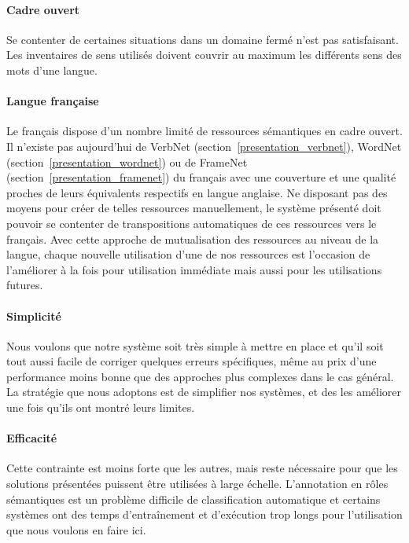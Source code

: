 \paragraph{Cadre ouvert} Se contenter de certaines situations dans un domaine
fermé n'est pas satisfaisant. Les inventaires de sens utilisés doivent couvrir
au maximum les différents sens des mots d'une langue.

\paragraph{Langue française} Le français dispose d'un nombre limité de
ressources sémantiques en cadre ouvert. Il n'existe pas aujourd'hui de VerbNet
(section~\ref{presentation_verbnet}), WordNet
(section~\ref{presentation_wordnet}) ou de FrameNet
(section~\ref{presentation_framenet}) du français avec une couverture et une
qualité proches de leurs équivalents respectifs en langue anglaise. Ne
disposant pas des moyens pour créer de telles ressources manuellement, le
système présenté doit pouvoir se contenter de transpositions automatiques de
ces ressources vers le français. Avec cette approche de mutualisation des
ressources au niveau de la langue, chaque nouvelle utilisation d'une de nos
ressources est l'occasion de l'améliorer à la fois pour utilisation immédiate
mais aussi pour les utilisations futures.

\paragraph{Simplicité} Nous voulons que notre système soit très simple à mettre
en place et qu'il soit tout aussi facile de corriger quelques erreurs
spécifiques, même au prix d'une performance moins bonne que des approches plus
complexes dans le cas général. La stratégie que nous adoptons est de simplifier
nos systèmes, et des les améliorer une fois qu'ils ont montré leurs limites.

\paragraph{Efficacité} Cette contrainte est moins forte que les autres, mais
reste nécessaire pour que les solutions présentées puissent être utilisées à
large échelle. L'annotation en rôles sémantiques est un problème difficile de
classification automatique et certains systèmes ont des temps d'entraînement et
d'exécution trop longs pour l'utilisation que nous voulons en faire ici.

